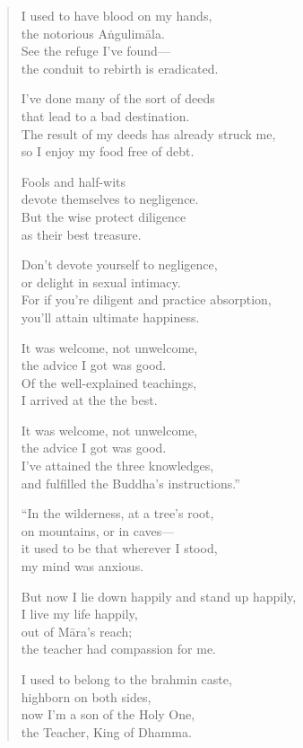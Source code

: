 \documentclass[12pt,openany]{book}%
\begin{document}
\begin{verse}
I used to have blood on my hands, \\
the notorious \textsanskrit{Aṅgulimāla}. \\
See the refuge I’ve found—\\
the conduit to rebirth is eradicated. 

I’ve done many of the sort of deeds \\
that lead to a bad destination. \\
The result of my deeds has already struck me, \\
so I enjoy my food free of debt. 

Fools and half-wits \\
devote themselves to negligence. \\
But the wise protect diligence \\
as their best treasure. 

Don’t devote yourself to negligence, \\
or delight in sexual intimacy. \\
For if you’re diligent and practice absorption, \\
you’ll attain ultimate happiness. 

It was welcome, not unwelcome, \\
the advice I got was good. \\
Of the well-explained teachings, \\
I arrived at the the best. 

It was welcome, not unwelcome, \\
the advice I got was good. \\
I’ve attained the three knowledges, \\
and fulfilled the Buddha’s instructions.” 

“In the wilderness, at a tree’s root, \\
on mountains, or in caves—\\
it used to be that wherever I stood, \\
my mind was anxious. 

But now I lie down happily and stand up happily, \\
I live my life happily, \\
out of \textsanskrit{Māra}’s reach; \\
the teacher had compassion for me. 

I used to belong to the brahmin caste, \\
highborn on both sides, \\
now I’m a son of the Holy One, \\
the Teacher, King of Dhamma. 


\end{verse}
\end{document}
